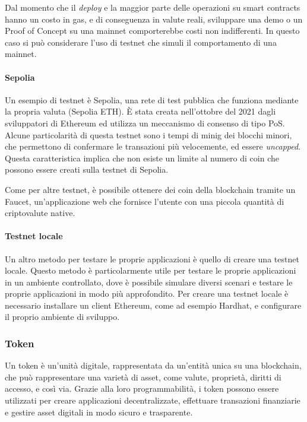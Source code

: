 Dal momento che il \textit{deploy} e la maggior parte delle operazioni su smart contracts hanno un costo in gas, e di conseguenza in valute reali, sviluppare una demo o un Proof of Concept su una mainnet comporterebbe costi non indifferenti.
In questo caso si può considerare l'uso di testnet che simuli il comportamento di una mainnet.
    
\paragraph{Sepolia}
Un esempio di testnet è Sepolia, una rete di test pubblica che funziona mediante la propria valuta (Sepolia ETH).
È stata creata nell'ottobre del 2021 dagli sviluppatori di Ethereum ed utilizza un meccanismo di consenso di tipo PoS.
Alcune particolarità di questa testnet sono i tempi di minig dei blocchi minori, che permettono di confermare le transazioni più velocemente, ed essere \textit{uncapped}.
Questa caratteristica implica che non esiste un limite al numero di coin che possono essere creati sulla testnet di Sepolia. \cite{sepolia}

Come per altre testnet, è possibile ottenere dei coin della blockchain tramite un Faucet, un'applicazione web che fornisce l'utente con una piccola quantità di criptovalute native.

\paragraph{Testnet locale}
Un altro metodo per testare le proprie applicazioni è quello di creare una testnet locale.
Questo metodo è particolarmente utile per testare le proprie applicazioni in un ambiente controllato, dove è possibile simulare diversi scenari e testare le proprie applicazioni in modo più approfondito.
Per creare una testnet locale è necessario installare un client Ethereum, come ad esempio Hardhat, e configurare il proprio ambiente di sviluppo. \cite{hardhat}

\subsubsection{Token}
Un token è un'unità digitale, rappresentata da un'entità unica su una blockchain, che può rappresentare una varietà di asset, come valute, proprietà, diritti di accesso, e così via.
Grazie alla loro programmabilità, i token possono essere utilizzati per creare applicazioni decentralizzate, effettuare transazioni finanziarie e gestire asset digitali in modo sicuro e trasparente. \cite{coinbase-token}


